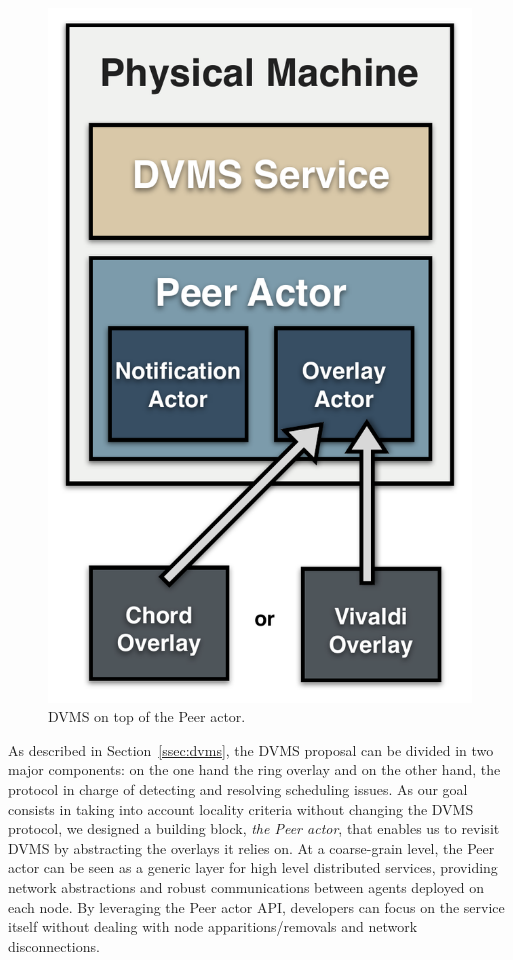 \begin{figure}
\vspace{-.7cm}\hspace*{.2cm}
  \includegraphics[width=\linewidth]{Figures/DVMS.pdf}
  \caption{DVMS on top of the Peer actor.}%
  \label{fig:peeractor}%
\end{figure}

As described in Section~\ref{ssec:dvms}, the DVMS proposal can be divided in two major
components: on the one hand the ring overlay and on the other hand, the protocol in charge
of detecting and resolving scheduling issues. As our goal consists in taking into account
locality criteria without changing the DVMS protocol, we designed a building block, \ie
\emph{the Peer actor}, that enables us to revisit DVMS by abstracting the overlays it
relies on. At a coarse-grain level, the Peer actor can be seen as a generic layer for high
level distributed services, providing network abstractions and robust communications
between agents deployed on each node. By leveraging the Peer actor API, developers can
focus on the service itself without dealing with node apparitions/removals and network
disconnections.

